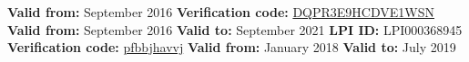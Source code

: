 %
%
%


\begin{certifications}
        {
            \textbf{Valid from:} September 2016
            \textbf{Verification code:} 
                \href{https://www.certmetrics.com/comptia/public/verification.aspx?code=DQPR3E9HCDVE1WSN}{DQPR3E9HCDVE1WSN}
        }
        {
            \textbf{Valid from:} September 2016
            \textbf{Valid to:} September 2021
            \textbf{LPI ID:} LPI000368945
            \textbf{Verification code:} \href{https://www.lpi.org/verify}{pfbbjhavvj}
        }
        {
            \textbf{Valid from:} January 2018
            \textbf{Valid to:} July 2019
        }
\end{certifications}